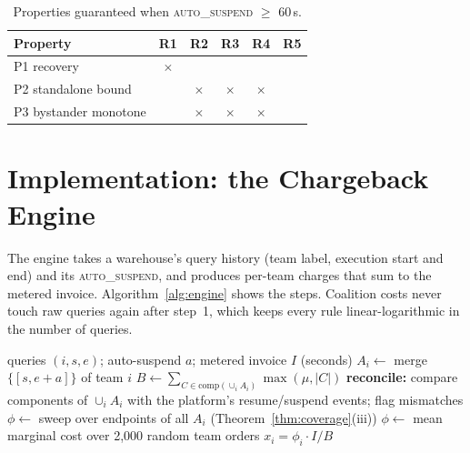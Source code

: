 \documentclass[sigconf]{acmart}
\newcommand{\autos}{\textsc{auto\_suspend}}
\newcommand{\yes}{\checkmark}
\newcommand{\no}{$\times$}
\begin{document}
\begin{table}[t]
\caption{Properties guaranteed when \autos{} $\ge$ 60\,s.}\label{tab:props}
\small
\begin{tabular}{lccccc}
\toprule
Property & R1 & R2 & R3 & R4 & R5 \\
\midrule
P1 recovery            & \no  & \yes & \yes & \yes & \yes \\
P2 standalone bound    & \yes & \no  & \no  & \no  & \yes \\
P3 bystander monotone  & \yes & \no  & \no  & \no  & \yes \\
\bottomrule
\end{tabular}
\end{table}

\section{Implementation: the Chargeback Engine}\label{sec:impl}
The engine takes a warehouse's query history (team label, execution start and end) and its \autos{}, and produces per-team
charges that sum to the metered invoice. Algorithm~\ref{alg:engine} shows the steps. Coalition costs never touch raw queries
again after step~1, which keeps every rule linear-logarithmic in the number of queries.

\begin{algorithm}[t]
\caption{Chargeback for one warehouse and one billing period}\label{alg:engine}
\small
\begin{algorithmic}[1]
\Require queries $(i, s, e)$; auto-suspend $a$; metered invoice $I$ (seconds)
\State $A_i \gets$ merge $\{[s, e+a]\}$ of team $i$ 
\State $B \gets \sum_{C \in \text{comp}(\cup_i A_i)} \max(\mu, |C|)$ 
\State \textbf{reconcile:} compare components of $\cup_i A_i$ with the platform's resume/suspend events; flag mismatches
 \State $\phi \gets$ sweep over endpoints of all $A_i$ (Theorem~\ref{thm:coverage}(iii))
\Else \State $\phi \gets$ mean marginal cost over 2,000 random team orders
\EndIf
\State \Return $x_i = \phi_i \cdot I / B$ 
\end{algorithmic}
\end{algorithm}
\end{document}
